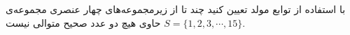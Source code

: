     \p 
با استفاده از توابع مولد تعیین کنید چند تا از زیرمجموعه‌های چهار عنصری مجموعه‌ی
$S = \{1, 2, 3, \cdots, 15\}$
حاوی هیچ دو عدد صحیح متوالی نیست.